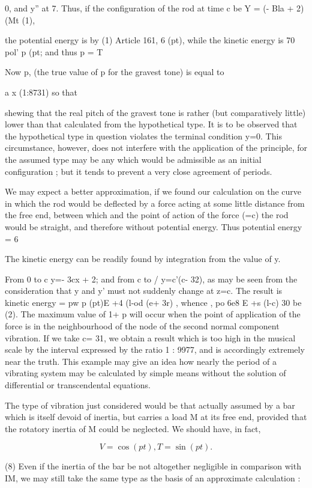 0, and y'' at 7. Thus, if the configuration of the rod at time c be Y =
(- Bla + 2) (Mt (1),

the potential energy is by (1) Article 161, 6 (pt), while the
kinetic energy is 70 pol' p (pt; and thus p = T

Now p, (the true value of p for the gravest tone) is equal to

a x (1:8731) so that

shewing that the real pitch of the gravest tone is rather (but
comparatively little) lower than that calculated from the hypothetical
type. It is to be observed that the hypothetical type in question
violates the terminal condition y=0. This circumstance, however, does
not interfere with the application of the principle, for the assumed
type may be any which would be admissible as an initial configuration ;
but it tends to prevent a very close agreement of periods.

We may expect a better approximation, if we found our calculation on the
curve in which the rod would be deflected by a force acting at some
little distance from the free end, between which and the point of action
of the force (=c) the rod would be straight, and therefore without
potential energy. Thus potential energy = 6

The kinetic energy can be readily found by integration from the value of
y.

From 0 to c y=- 3cx + 2; and from c to / y=c'(c- 32),
as may be seen from the consideration that y and y' must not suddenly
change at z=c. The result is
kinetic energy = pw p (pt)E +4 (l-od (e+ 3r) , whence , po 6e8 E +s
(l-c) 30 be (2). The maximum value of 1+ p will occur when the point of
application of the force is in the neighbourhood of the node of the
second normal component vibration. If we take c= 31, we obtain a result
which is too high in the musical scale by the interval expressed by the
ratio 1 : 9977, and is accordingly extremely near the truth. This
example may give an idea how nearly the period of a vibrating system may
be calculated by simple means without the solution of differential or
transcendental equations.

The type of vibration just considered would be that actually assumed by
a bar which is itself devoid of inertia, but carries a load M at its
free end, provided that the rotatory inertia of M could be neglected. We
should have, in fact,

\[V= \cos(pt),  T= \sin(pt).\]

(8) Even if the inertia of the bar be not altogether negligible in
comparison with IM, we may still take the same type as the basis of an
approximate calculation :

